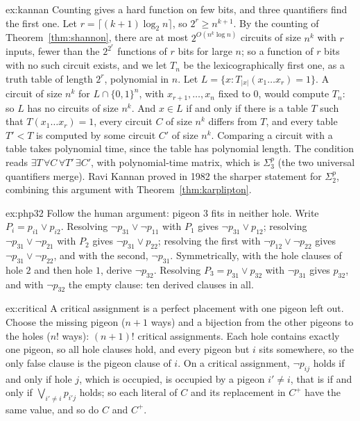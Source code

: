 \begin{solution}{ex:kannan}
\idea Counting gives a hard function on few bits, and three quantifiers find the first one.
\writeup Let $r=\lceil(k+1)\log_2n\rceil$, so $2^r\ge n^{k+1}$. By the counting of Theorem~\ref{thm:shannon}, there are at most $2^{O(n^k\log n)}$ circuits of size $n^k$ with $r$ inputs, fewer than the $2^{2^r}$ functions of $r$ bits for large $n$; so a function of $r$ bits with no such circuit exists, and we let $T_n$ be the lexicographically first one, as a truth table of length $2^r$, polynomial in $n$. Let $L=\{x:T_{|x|}(x_1\dots x_r)=1\}$. A circuit of size $n^k$ for $L\cap\{0,1\}^n$, with $x_{r+1},\dots,x_n$ fixed to $0$, would compute $T_n$: so $L$ has no circuits of size $n^k$. And $x\in L$ if and only if there is a table $T$ such that $T(x_1\dots x_r)=1$, every circuit $C$ of size $n^k$ differs from $T$, and every table $T'<T$ is computed by some circuit $C'$ of size $n^k$. Comparing a circuit with a table takes polynomial time, since the table has polynomial length. The condition reads $\exists T\,\forall C\,\forall T'\,\exists C'$, with polynomial-time matrix, which is $\Sigma_3^p$ (the two universal quantifiers merge). Ravi Kannan proved in 1982 the sharper statement for $\Sigma_2^p$, combining this argument with Theorem~\ref{thm:karplipton}.
\end{solution}

\begin{solution}{ex:php32}
\idea Follow the human argument: pigeon $3$ fits in neither hole.
\writeup Write $P_i=p_{i1}\lor p_{i2}$. Resolving $\lnot p_{31}\lor\lnot p_{11}$ with $P_1$ gives $\lnot p_{31}\lor p_{12}$; resolving $\lnot p_{31}\lor\lnot p_{21}$ with $P_2$ gives $\lnot p_{31}\lor p_{22}$; resolving the first with $\lnot p_{12}\lor\lnot p_{22}$ gives $\lnot p_{31}\lor\lnot p_{22}$, and with the second, $\lnot p_{31}$. Symmetrically, with the hole clauses of hole $2$ and then hole $1$, derive $\lnot p_{32}$. Resolving $P_3=p_{31}\lor p_{32}$ with $\lnot p_{31}$ gives $p_{32}$, and with $\lnot p_{32}$ the empty clause: ten derived clauses in all.
\end{solution}

\begin{solution}{ex:critical}
\idea A critical assignment is a perfect placement with one pigeon left out.
\writeup Choose the missing pigeon ($n+1$ ways) and a bijection from the other pigeons to the holes ($n!$ ways): $(n+1)!$ critical assignments. Each hole contains exactly one pigeon, so all hole clauses hold, and every pigeon but $i$ sits somewhere, so the only false clause is the pigeon clause of $i$. On a critical assignment, $\lnot p_{ij}$ holds if and only if hole $j$, which is occupied, is occupied by a pigeon $i'\ne i$, that is if and only if $\bigvee_{i'\ne i}p_{i'j}$ holds; so each literal of $C$ and its replacement in $C^+$ have the same value, and so do $C$ and $C^+$.
\end{solution}

